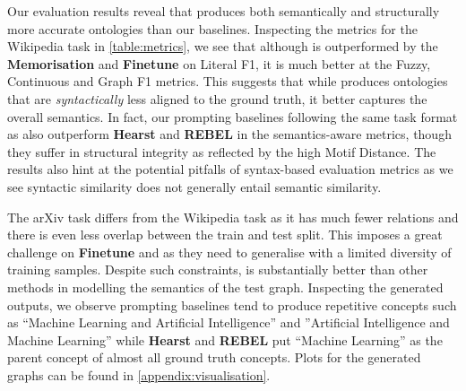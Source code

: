 

Our evaluation results reveal that \name produces both semantically and structurally more accurate ontologies than our baselines. Inspecting the metrics for the Wikipedia task in \cref{table:metrics}, we see that although \name is outperformed by the \textbf{Memorisation} and \textbf{Finetune} on Literal F1, it is much better at the Fuzzy, Continuous and Graph F1 metrics. This suggests that while \name produces ontologies that are \emph{syntactically} less aligned to the ground truth, it better captures the overall semantics. In fact, our prompting baselines following the same task format as \name also outperform \textbf{Hearst} and \textbf{REBEL} in the semantics-aware metrics, though they suffer in structural integrity as reflected by the high Motif Distance. The results also hint at the potential pitfalls of syntax-based evaluation metrics as we see syntactic similarity does not generally entail semantic similarity.

The arXiv task differs from the Wikipedia task as it has much fewer relations and there is even less overlap between the train and test split. This imposes a great challenge on \textbf{Finetune} and \name as they need to generalise with a limited diversity of training samples. Despite such constraints, \name is substantially better than other methods in modelling the semantics of the test graph. Inspecting the generated outputs, we observe prompting baselines tend to produce repetitive concepts such as ``Machine Learning and Artificial Intelligence'' and ''Artificial Intelligence and Machine Learning'' while \textbf{Hearst} and \textbf{REBEL} put ``Machine Learning'' as the parent concept of almost all ground truth concepts. Plots for the generated graphs can be found in \cref{appendix:visualisation}.

